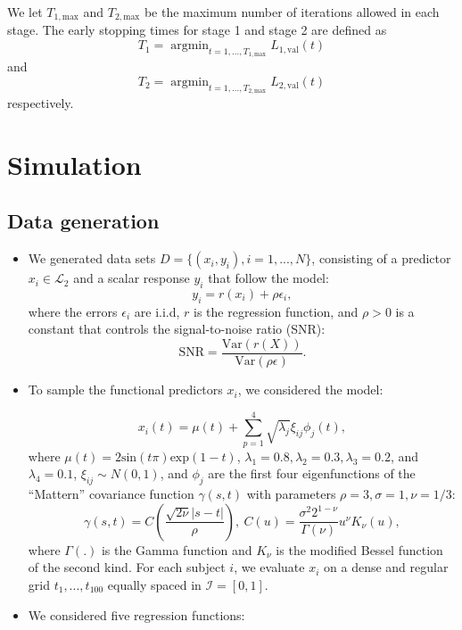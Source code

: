 \documentclass{article}
\DeclareMathOperator*{\argmin}{argmin}
\begin{document}
We let $T_{1,\text{max}}$  and $T_{2,\text{max}}$ be the maximum number of iterations allowed in each stage. The early stopping times for stage 1 and stage 2 are defined as 
$$T_1 = \argmin_{t=1,..., T_{1,\text{max}}} L_{1,\text{val}}(t)$$
and $$T_2 = \argmin_{t=1,..., T_{2,\text{max}}} L_{2,\text{val}}(t)$$
respectively. 


\section{Simulation}
\subsection{Data generation}
\begin{itemize}
    \item We generated data sets $D = \{(x_i, y_i), i = 1,..., N\}$, consisting of a predictor $x_i\in\mathcal{L}_2$ and a scalar response $y_i$ that follow the model: 
 \begin{equation} \label{eq:gen}
y_i = r(x_i) + \rho \epsilon_i,
\end{equation}
where the errors $\epsilon_i$ are i.i.d, $r$ is the regression function,  and  $\rho > 0$ is a constant that controls the signal-to-noise ratio (SNR): 
$$\text{SNR} = \frac{\text{Var}(r(X))}{\text{Var}(\rho\epsilon)}.$$
\item To sample the functional predictors $x_i$, we considered the model:

\begin{equation} \label{eq:xmodel}
    x_i(t) = \mu(t) + \sum_{p=1}^4 \sqrt{\lambda_j}\xi_{ij}\phi_j(t),
\end{equation}
where $\mu(t) = 2\text{sin}(t\pi) \text{exp}(1-t)$, $\lambda_1 = 0.8, \lambda_2 = 0.3, \lambda_3 = 0.2$, and $\lambda_4 = 0.1$,  $\xi_{ij}\sim N(0,1) $,  and $\phi_j$ are the first four eigenfunctions of the ``Mattern'' covariance function $\gamma(s,t)$ with parameters $\rho = 3, \sigma = 1, \nu = 1/3$: 
 $$\gamma(s,t) = C\left(\frac{\sqrt{2\nu}|s-t|}{\rho}\right), \ C(u) = \frac{\sigma^2 2^{1-\nu}}{\Gamma(\nu)} u^{\nu} K_{\nu}(u),$$
  where $\Gamma(.)$ is the Gamma function and $K_{\nu}$ is the modified Bessel function of the second kind. For each subject $i$, we evaluate $x_i$ on a dense and regular grid $t_1,..., t_{100}$ equally spaced in $\mathcal{I} = [0,1]$. 
\item We considered five regression functions:
\begin{itemize}


\end{itemize}
\end{itemize}
\end{document}
